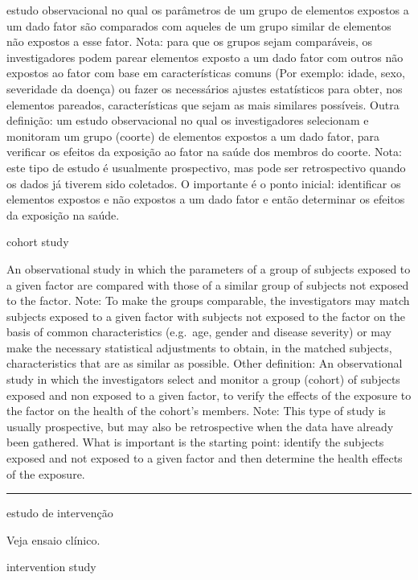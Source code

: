 \documentclass[
]{book}
\begin{document}
estudo observacional no qual os parâmetros de um grupo de elementos expostos a um dado fator são comparados com aqueles de um grupo similar de elementos não expostos a esse fator. Nota: para que os grupos sejam comparáveis, os investigadores podem parear elementos exposto a um dado fator com outros não expostos ao fator com base em características comuns (Por exemplo: idade, sexo, severidade da doença) ou fazer os necessários ajustes estatísticos para obter, nos elementos pareados, características que sejam as mais similares possíveis. Outra definição: um estudo observacional no qual os investigadores selecionam e monitoram um grupo (coorte) de elementos expostos a um dado fator, para verificar os efeitos da exposição ao fator na saúde dos membros do coorte. Nota: este tipo de estudo é usualmente prospectivo, mas pode ser retrospectivo quando os dados já tiverem sido coletados. O importante é o ponto inicial: identificar os elementos expostos e não expostos a um dado fator e então determinar os efeitos da exposição na saúde.

cohort study

An observational study in which the parameters of a group of subjects exposed to a given factor are compared with those of a similar group of subjects not exposed to the factor. Note: To make the groups comparable, the investigators may match subjects exposed to a given factor with subjects not exposed to the factor on the basis of common characteristics (e.g.~age, gender and disease severity) or may make the necessary statistical adjustments to obtain, in the matched subjects, characteristics that are as similar as possible. Other definition: An observational study in which the investigators select and monitor a group (cohort) of subjects exposed and non exposed to a given factor, to verify the effects of the exposure to the factor on the health of the cohort's members. Note: This type of study is usually prospective, but may also be retrospective when the data have already been gathered. What is important is the starting point: identify the subjects exposed and not exposed to a given factor and then determine the health effects of the exposure.

\begin{center}\rule{0.5\linewidth}{0.5pt}\end{center}

estudo de intervenção

Veja ensaio clínico.

intervention study
\end{document}
